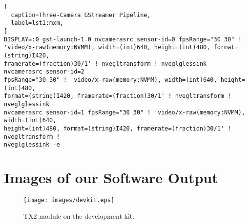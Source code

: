 \documentclass[letterpaper,10pt,serif,draftclsnofoot,onecolumn,compsoc,titlepage]{IEEEtran}
\begin{document}
\begin{lstlisting}[
  caption=Three-Camera GStreamer Pipeline,
  label=lst1:mxm,
]
DISPLAY=:0 gst-launch-1.0 nvcamerasrc sensor-id=0 fpsRange="30 30" ! 
'video/x-raw(memory:NVMM), width=(int)640, height=(int)480, format=(string)I420, 
framerate=(fraction)30/1' ! nvegltransform ! nveglglessink  nvcamerasrc sensor-id=2 
fpsRange="30 30" ! 'video/x-raw(memory:NVMM), width=(int)640, height=(int)480, 
format=(string)I420, framerate=(fraction)30/1' ! nvegltransform ! nveglglessink 
nvcamerasrc sensor-id=1 fpsRange="30 30" ! 'video/x-raw(memory:NVMM), width=(int)640, 
height=(int)480, format=(string)I420, framerate=(fraction)30/1' ! nvegltransform ! 
nveglglessink -e
\end{lstlisting}

\section{Images of our Software Output}

\begin{figure}[H]
	\centering
	\label{fig:TX2 module on the development kit.}
	\texttt{[image: images/devkit.eps]}
	\caption{TX2 module on the development kit. \label{overflow}}
\end{figure}

%
%
\end{document}
